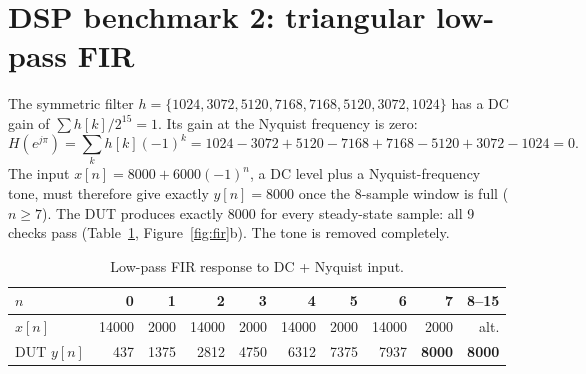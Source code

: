 \documentclass[11pt,a4paper]{report}
\begin{document}
\section{DSP benchmark 2: triangular low-pass FIR}
The symmetric filter
$h=\{1024,3072,5120,7168,7168,5120,3072,1024\}$ has a DC gain of
$\sum h[k]/2^{15}=1$. Its gain at the Nyquist frequency is zero:
\begin{equation}
  H(e^{j\pi}) = \sum_k h[k](-1)^k
  = 1024-3072+5120-7168+7168-5120+3072-1024 = 0.
\end{equation}
The input $x[n]=8000+6000(-1)^n$, a DC level plus a Nyquist-frequency tone,
must therefore give exactly $y[n]=8000$ once the 8-sample window is full
($n\ge7$). The DUT produces exactly 8000 for every steady-state sample: all
9 checks pass (Table~\ref{tab:lpf}, Figure~\ref{fig:fir}b). The tone is
removed completely.

\begin{table}[H]
  \centering
  \caption{Low-pass FIR response to DC + Nyquist input.}
  \label{tab:lpf}
  \small
  \begin{tabular}{@{}lrrrrrrrrr@{}}
    \toprule
    $n$ & 0 & 1 & 2 & 3 & 4 & 5 & 6 & 7 & 8--15 \\
    \midrule
    $x[n]$      & 14000 & 2000 & 14000 & 2000 & 14000 & 2000 & 14000 & 2000 & alt. \\
    DUT $y[n]$  & 437 & 1375 & 2812 & 4750 & 6312 & 7375 & 7937 & \textbf{8000} & \textbf{8000} \\
    \bottomrule
  \end{tabular}
\end{table}
\end{document}
